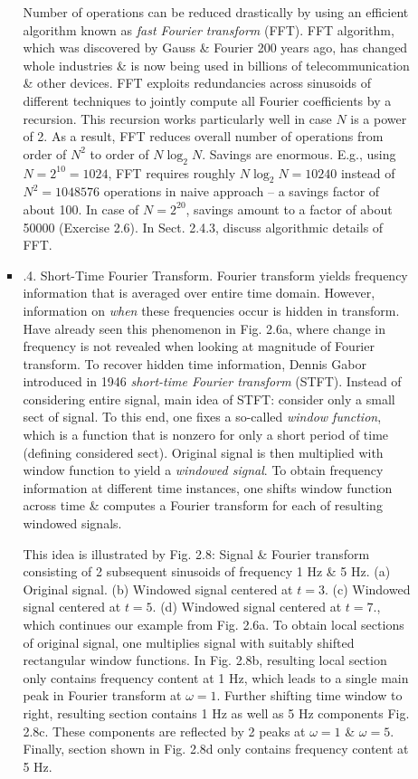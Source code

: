 \documentclass{article}
\begin{document}
\begin{itemize}
\begin{itemize}
\begin{itemize}
			Number of operations can be reduced drastically by using an efficient algorithm known as {\it fast Fourier transform} (FFT). FFT algorithm, which was discovered by Gauss \& Fourier 200 years ago, has changed whole industries \& is now being used in billions of telecommunication \& other devices. FFT exploits redundancies across sinusoids of different techniques to jointly compute all Fourier coefficients by a recursion. This recursion works particularly well in case $N$ is a power of 2. As a result, FFT reduces overall number of operations from order of $N^2$ to order of $N\log_2N$. Savings are enormous. E.g., using $N = 2^{10} = 1024$, FFT requires roughly $N\log_2N = 10240$ instead of $N^2 = 1048576$ operations in naive approach -- a savings factor of about 100. In case of $N = 2^{20}$, savings amount to a factor of about 50000 (Exercise 2.6). In Sect. 2.4.3, discuss algorithmic details of FFT.
			\item {.4. Short-Time Fourier Transform.} Fourier transform yields frequency information that is averaged over entire time domain. However, information on {\it when} these frequencies occur is hidden in transform. Have already seen this phenomenon in {\sf Fig. 2.6a}, where change in frequency is not revealed when looking at magnitude of Fourier transform. To recover hidden time information, {\sc Dennis Gabor} introduced in 1946 {\it short-time Fourier transform} (STFT). Instead of considering entire signal, main idea of STFT: consider only a small sect of signal. To this end, one fixes a so-called {\it window function}, which is a function that is nonzero for only a short period of time (defining considered sect). Original signal is then multiplied with window function to yield a {\it windowed signal}. To obtain frequency information at different time instances, one shifts window function across time \& computes a Fourier transform for each of resulting windowed signals.
			
			This idea is illustrated by {\sf Fig. 2.8: Signal \& Fourier transform consisting of 2 subsequent sinusoids of frequency 1 Hz \& 5 Hz. (a) Original signal. (b) Windowed signal centered at $t = 3$. (c) Windowed signal centered at $t = 5$. (d) Windowed signal centered at $t = 7$.}, which continues our example from {\sf Fig. 2.6a}. To obtain local sections of original signal, one multiplies signal with suitably shifted rectangular window functions. In {\sf Fig. 2.8b}, resulting local section only contains frequency content at 1 Hz, which leads to a single main peak in Fourier transform at $\omega = 1$. Further shifting time window to right, resulting section contains 1 Hz as well as 5 Hz components {\sf Fig. 2.8c}. These components are reflected by 2 peaks at $\omega = 1$ \& $\omega = 5$. Finally, section shown in {\sf Fig. 2.8d} only contains frequency content at 5 Hz.
			

\end{itemize}
\end{itemize}
\end{itemize}
\end{document}
